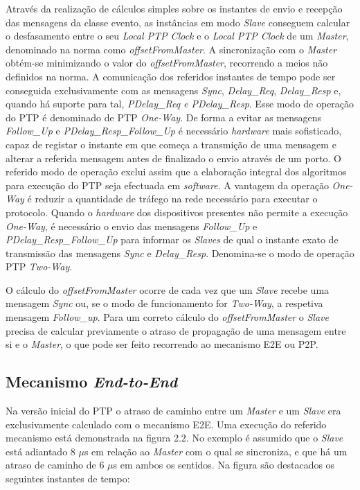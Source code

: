 Através da realização de cálculos simples sobre os instantes de envio e recepção das mensagens da classe evento, as instâncias em modo \textit{Slave} conseguem calcular o desfasamento entre o seu \textit{Local PTP Clock} e o \textit{Local PTP Clock} de um \textit{Master}, denominado na norma como \textit{offsetFromMaster}. A sincronização com o \textit{Master} obtém-se minimizando o valor do \textit{offsetFromMaster}, recorrendo a meios não definidos na norma. A comunicação dos referidos instantes de tempo pode ser conseguida exclusivamente com as mensagens \textit{Sync}, \textit{Delay\_Req}, \textit{Delay\_Resp} e, quando há suporte para tal, \textit{PDelay\_Req e PDelay\_Resp}. Esse modo de operação do PTP é denominado de PTP \textit{One-Way}. De forma a evitar as mensagens \textit{Follow\_Up} e \textit{PDelay\_Resp\_Follow\_Up} é necessário \textit{hardware} mais sofisticado, capaz de registar o instante em que começa a transmição de uma mensagem e alterar a referida mensagem antes de finalizado o envio através de um porto. O referido modo de operação exclui assim que a elaboração integral dos algoritmos para execução do PTP seja efectuada em \textit{software}. A vantagem da operação \textit{One-Way} é reduzir a quantidade de tráfego na rede necessário para executar o protocolo. Quando o \textit{hardware} dos dispositivos presentes não permite a execução \textit{One-Way}, é necessário o envio das mensagens \textit{Follow\_Up} e \textit{PDelay\_Resp\_Follow\_Up} para informar os \textit{Slaves} de qual o instante exato de transmissão das mensagens \textit{Sync} e \textit{Delay\_Resp}. Denomina-se o modo de operação PTP \textit{Two-Way}.   \par
O cálculo do \textit{offsetFromMaster} ocorre de cada vez que um \textit{Slave} recebe uma mensagem \textit{Sync} ou, se o modo de funcionamento for \textit{Two-Way}, a respetiva mensagem \textit{Follow\_up}. Para um correto cálculo do \textit{offsetFromMaster} o \textit{Slave} precisa de calcular previamente o atraso de propagação de uma mensagem entre si e o \textit{Master}, o que pode ser feito recorrendo ao mecanismo E2E ou P2P.

\subsection{Mecanismo \textit{End-to-End}}

Na versão inicial do PTP o atraso de caminho entre um \textit{Master} e um \textit{Slave} era exclusivamente calculado com o mecanismo E2E. Uma execução do referido mecanismo está demonstrada na figura 2.2. No exemplo é assumido que o \textit{Slave} está adiantado 8 $\mu$s em relação ao \textit{Master} com o qual se sincroniza, e que há um atraso de caminho de  6 $\mu$s em ambos os sentidos. Na figura são destacados os seguintes instantes de tempo: 



